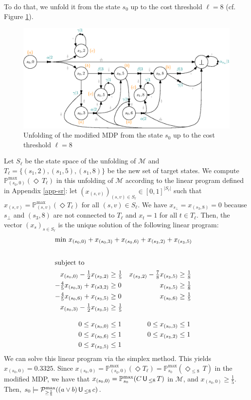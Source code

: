 \begin{example}
To do that, we unfold it from the state $s_0$ up to the cost threshold $\ell=8$ (cf. Figure \ref{cost-bounded-until3}).
\begin{figure}[h]
  \centering
  \includegraphics[width=0.9\linewidth]{resources/MDPExample-unfolded}
  \captionsetup{justification=centering}
  \caption{Unfolding of the modified MDP from the state $s_0$ up to the cost threshold $\ell=8$}
  \label{cost-bounded-until3}
\end{figure}
\end{example}
Let $S_\ell$ be the state space of the unfolding of $\mathcal{M}$ and $T_\ell = \{(s_1, 2), (s_1, 5), (s_1, 8)\} $
be the new set of target states.
We compute $\mathbb{P}^{\max}_{(s_0, 0)}(\Diamond \, T_{\ell})$ in this unfolding of $\mathcal{M}$ according to the linear program defined in Appendix \ref{app-sr}: let $(x_{(s, v)})_{(s, v) \in S_{\ell}} \in [0, 1]^{|S_{\ell}|}$ such that $x_{(s, v)} = \mathbb{P}^{\max}_{(s, v)}(\Diamond T_\ell)$ for all $(s, v) \in S_\ell$.
We have $x_{s_\bot} = x_{(s_3, 8)} = 0$
because $s_{\bot}$ and $(s_3, 8)$ are not connected to $T_\ell$ and $x_t = 1$ for all $t \in T_\ell$. Then, the vector $(x_s)_{s \in S_\ell}$ is the unique solution of the following linear program:
\begin{align*}
\intertext{\centering $\min \, x_{(s_0,0)} + x_{(s_0,3)} + x_{(s_0,6)} + x_{(s_3,2)} + x_{(s_3,5)}$}\\
\intertext{subject to}
  x_{(s_0,0)} - \tfrac{1}{2} x_{(s_3,2)} &\geq \tfrac{1}{5} &
  x_{(s_3,2)} - \tfrac{7}{8} x_{(s_3,5)} &\geq \tfrac{1}{8}\\
  - \tfrac{4}{5} x_{(s_0,3)} + x_{(s3,2)} &\geq 0 &
  x_{(s_3,5)} &\geq \tfrac{1}{8}\\
  - \tfrac{4}{5} x_{(s_0,6)} + x_{(s_3,5)} &\geq 0 &
  x_{(s_0,6)} &\geq \tfrac{1}{5}\\
  x_{(s_0,3)} - \tfrac{1}{2} x_{(s_3,5)} &\geq \tfrac{1}{5} && & \\[1em]
  0 \leq x_{(s_0,0)} &\leq 1 &
  0 \leq x_{(s_0,3)} &\leq 1 \\
  0 \leq x_{(s_0,6)} &\leq 1 &
  0 \leq x_{(s_3,2)} &\leq 1 \\
  0 \leq x_{(s_3,5)} &\leq 1 & &
\end{align*}
We can solve this linear program via the simplex method. This yields ${x_{(s_0, 0)}=0.3325}$. Since $x_{(s_0, 0)} = \mathbb{P}_{(s_0, 0)}^{\max}(\Diamond T_\ell) = \mathbb{P}^{\max}_{s_0} (\Diamond_{\leq 8}\, T)$ in the modified MDP, we have that $x_{(s_0, 0)} = \mathbb{P}^{\max}_{s_0}(C \,\text{\sffamily U}\,_{\leq 8} \, T)$ in
$\mathcal{M}$, and $x_{(s_0, 0)} \geq \frac{1}{5}$. Then, $s_0 \models \mathcal{P}_{\geq \frac{1}{5}}^{\max}((a \vee b) \,\text{\sffamily U}\,_{\leq 8}\, c)$.
